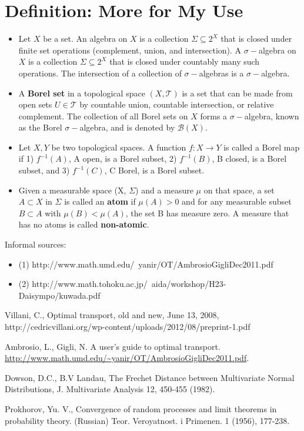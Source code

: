 \documentclass[10pt]{article}
\begin{document}
\section{Definition: More for My Use}
\begin{itemize}
\item Let $X$ be a set. An algebra on $X$ is a collection $\Sigma \subseteq 2^X$ that is closed under finite set operations (complement, union, and intersection). A 
 $\sigma-$algebra on $X$ is a collection $\Sigma \subseteq 2^X$ that is closed under countably many such operations. The intersection of a collection of $\sigma-$algebras is a $\sigma-$algebra. 
 \item A \textbf{Borel set} in a topological space $(X, \mathscr{T})$ is a set that can be made from open sets $U \in \mathscr{T}$ by countable union, countable intersection, or relative complement. The collection of all Borel sets on $X$ forms a $\sigma-$algebra, known as the Borel $\sigma-$algebra, and is denoted by $\mathcal{B}(X)$.
 \item Let $X, Y$ be two topological spaces. A function $f: X \rightarrow Y$ is called a Borel map if 1) $f^{-1}(A)$, A open, is a Borel subset, 2) $f^{-1}(B)$, B closed, is a Borel subset, and 3) $f^{-1}(C)$, C Borel, is a Borel subset.
 \item Given a measurable space (X, $\Sigma$) and a measure $\mu$ on that space, a set $A \subset X$ in $\Sigma$ is called an \textbf{atom} if $\mu(A) > 0$ and for any measurable subset $B \subset A$ with $\mu(B) < \mu(A)$, the set B has measure zero. A measure that has no atoms is called \textbf{non-atomic}.
\end{itemize}

Informal sources:
\begin{itemize}
\item (1) http://www.math.umd.edu/~yanir/OT/AmbrosioGigliDec2011.pdf
\item (2) http://www.math.tohoku.ac.jp/~aida/workshop/H23-Daisympo/kuwada.pdf
\end{itemize}
\begin{thebibliography}{9}%
Villani, C., Optimal transport, old and new, June 13, 2008, http://cedricvillani.org/wp-content/uploads/2012/08/preprint-1.pdf 

Ambrosio, L., Gigli, N. A user's guide to optimal transport.  \url{http://www.math.umd.edu/~yanir/OT/AmbrosioGigliDec2011.pdf}.

Dowson, D.C., B.V Landau, The Frechet Distance between Multivariate Normal Distributions, J. Multivariate Analysis 12, 450-455 (1982). 

Prokhorov, Yu. V., Convergence of random processes and limit theorems in probability theory. (Russian) Teor. Veroyatnost. i Primenen. 1 (1956), 177-238.


\end{thebibliography}
\end{document}
